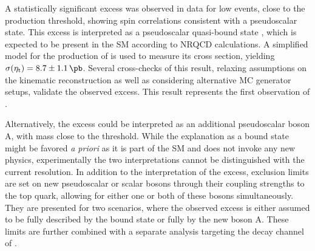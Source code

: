 A statistically significant excess was observed in data for low \mtt events, close to the \ttbar production threshold, showing spin correlations consistent with a pseudoscalar state. This excess is interpreted as a pseudoscalar \ttbar quasi-bound state \etat, which is expected to be present in the SM according to NRQCD calculations. A simplified model for the production of \etat is used to measure its cross section, yielding $\sigetat = 8.7 \pm 1.1\,\si{\pb}$. Several cross-checks of this result, relaxing assumptions on the \ttbar kinematic reconstruction as well as considering alternative MC generator setups, validate the observed excess. This result represents the first observation of \etat.

Alternatively, the excess could be interpreted as an additional pseudoscalar boson A, with mass close to the \ttbar threshold. While the explanation as a \ttbar bound state might be favored \textit{a priori} as it is part of the SM and does not invoke any new physics, experimentally the two interpretations cannot be distinguished with the current resolution.
In addition to the interpretation of the excess, exclusion limits are set on new pseudoscalar or scalar bosons \AH through their coupling strengths to the top quark, allowing for either one or both of these bosons simultaneously. They are presented for two scenarios, where the observed excess is either assumed to be fully described by the bound state \etat or fully by the new boson A. These limits are further combined with a separate analysis targeting the \ljets decay channel of \ttbar.





